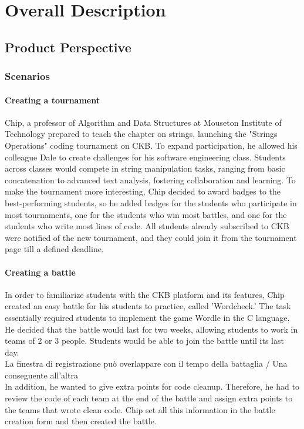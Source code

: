 \chapter{Overall Description}
\section{Product Perspective}
\subsection{Scenarios}

\subsubsection{Creating a tournament}
Chip, a professor of Algorithm and Data Structures at Mouseton Institute of Technology prepared to teach the chapter on strings, launching the "Strings Operations" coding tournament on CKB.
To expand participation, he allowed his colleague Dale to create challenges for his software engineering class.
Students across classes would compete in string manipulation tasks, ranging from basic concatenation to advanced text analysis, fostering collaboration and learning.
To make the tournament more interesting, Chip decided to award badges to the best-performing students, so he added badges for the students who participate in most tournaments, one for the students who win most battles, and one for the students who write most lines of code.
All students already subscribed to CKB were notified of the new tournament, and they could join it from the tournament page till a defined deadline.

\subsubsection{Creating a battle}
In order to familiarize students with the CKB platform and its features, Chip created an easy battle for his students to practice, called 'Wordcheck.' 
The task essentially required students to implement the game Wordle in the C language. 
He decided that the battle would last for two weeks, allowing students to work in teams of 2 or 3 people. Students would be able to join the battle until its last day.
\\ {\color{red} La finestra di registrazione può overlappare con il tempo della battaglia / Una conseguente all'altra} \\
In addition, he wanted to give extra points for code cleanup. 
Therefore, he had to review the code of each team at the end of the battle and assign extra points to the teams that wrote clean code. 
Chip set all this information in the battle creation form and then created the battle.

